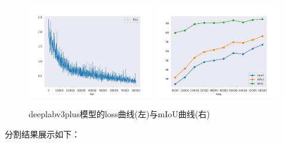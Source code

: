 \documentclass[12pt]{ctexart}
\begin{document}
\begin{figure}[htbp]  %
    \centering        %
    \includegraphics[width=0.49\textwidth]{result/plot/loss_deeplabv3plus.jpg}
    \includegraphics[width=0.49\textwidth]{result/plot/acc_deeplabv3plus.jpg} 
    \caption{deeplabv3plus模型的loss曲线(左)与mIoU曲线(右)}
    \label{fig:loss_acc_deeplabv3plus}
\end{figure}
分割结果展示如下：
\end{document}
